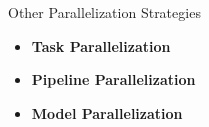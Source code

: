     \begin{frame}{Other Parallelization Strategies}
        \centering
        \begin{itemize}
            \item \textbf{Task Parallelization}
            \item \textbf{Pipeline Parallelization}
            \item \textbf{Model Parallelization}
        \end{itemize}
    \end{frame}
